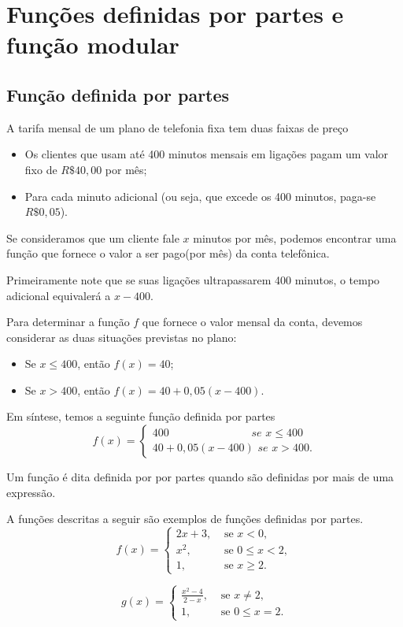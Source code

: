 
\chapter{Funções definidas por partes e função modular}
\section{Função definida por partes}
A tarifa mensal de um plano de telefonia fixa tem duas faixas de preço
\begin{itemize}
\item[•] Os clientes que usam até 400 minutos mensais em ligações pagam um valor fixo de $R\$ 40,00$ por mês;
\item[•] Para cada minuto adicional (ou seja, que excede os 400 minutos, paga-se $R\$ 0,05$).

\end{itemize}

Se consideramos que um cliente fale $x$ minutos por mês, podemos encontrar uma função que fornece o valor a ser pago(por mês) da conta telefônica.

Primeiramente note que se suas ligações ultrapassarem 400 minutos, o tempo adicional equivalerá a $x-400$.

Para determinar a função $f$ que fornece o valor mensal da conta, devemos considerar as duas situações previstas no plano:

\begin{itemize}
\item[•] Se $x \leq 400$, então $f(x)=40$;
\item[•] Se $x > 400$, então $f(x)=40+0,05(x-400)$.
\end{itemize}

Em síntese, temos a seguinte função definida por partes
$$ f(x)=\left\{\begin{array}{cc} 400  \hspace{3cm}\,\, se \,\, x \leq
400\\
40+0,05(x-400) \,\, se \,\, x>400.
\end{array}\right.$$

\begin{defin} Um função é dita definida por por partes quando são definidas por mais de uma expressão.
\end{defin}

\begin{exe}\label{exeporparte} A funções descritas a seguir são exemplos de funções definidas por partes.
\[f(x)=\begin{cases} 2x+3,& \text{ se }x<0,\\
x^2,& \text{ se }0\leq x<2, \\
1,& \text{ se }x\geq 2.\end{cases}\]

\[g(x)=\begin{cases}\frac{x^2-4}{2-x},& \text{ se }x\neq 2,\\
1,& \text{ se }0\leq x=2. \end{cases}\]
\end{exe}



